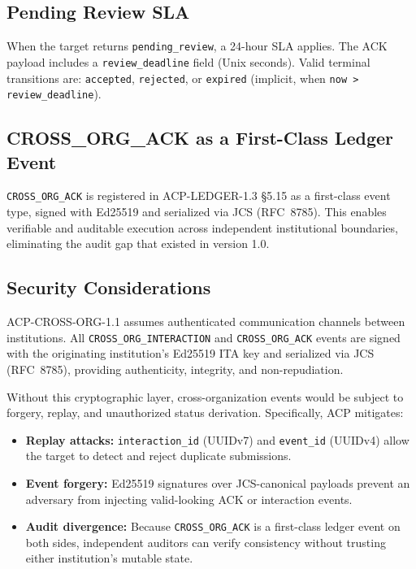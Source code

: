 \documentclass[11pt]{article}
\theoremstyle{definition}
\begin{document}
\subsection{Pending Review SLA}

When the target returns \texttt{pending\_review}, a 24-hour SLA applies.
The ACK payload includes a \texttt{review\_deadline} field (Unix seconds).
Valid terminal transitions are: \texttt{accepted}, \texttt{rejected}, or \texttt{expired} (implicit, when \texttt{now > review\_deadline}).

\subsection{CROSS\_ORG\_ACK as a First-Class Ledger Event}

\texttt{CROSS\_ORG\_ACK} is registered in ACP-LEDGER-1.3 §5.15 as a first-class event type,
signed with Ed25519 and serialized via JCS (RFC~8785).
This enables verifiable and auditable execution across independent institutional boundaries,
eliminating the audit gap that existed in version 1.0.

\subsection{Security Considerations}

ACP-CROSS-ORG-1.1 assumes authenticated communication channels between institutions.
All \texttt{CROSS\_ORG\_INTERACTION} and \texttt{CROSS\_ORG\_ACK} events are signed with
the originating institution's Ed25519 ITA key and serialized via JCS (RFC~8785),
providing authenticity, integrity, and non-repudiation.

Without this cryptographic layer, cross-organization events would be subject to forgery,
replay, and unauthorized status derivation.
Specifically, ACP mitigates:
\begin{itemize}[noitemsep]
  \item \textbf{Replay attacks:} \texttt{interaction\_id} (UUIDv7) and \texttt{event\_id} (UUIDv4)
        allow the target to detect and reject duplicate submissions.
  \item \textbf{Event forgery:} Ed25519 signatures over JCS-canonical payloads prevent
        an adversary from injecting valid-looking ACK or interaction events.
  \item \textbf{Audit divergence:} Because \texttt{CROSS\_ORG\_ACK} is a first-class ledger
        event on both sides, independent auditors can verify consistency without
        trusting either institution's mutable state.
\end{itemize}
\end{document}
